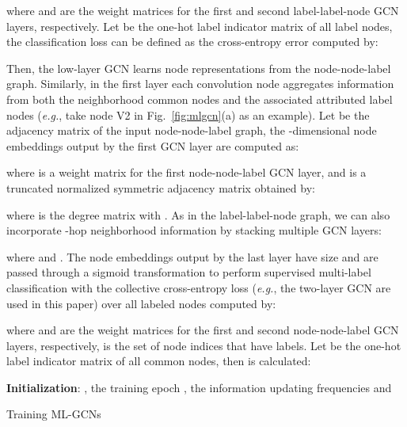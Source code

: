 \documentclass[conference]{IEEEtran}
\begin{document}
where  and  are the weight matrices for the first and second label-label-node GCN layers, respectively. Let  be the one-hot label indicator matrix of all label nodes, the classification loss can be defined as the cross-entropy error computed by:


Then, the low-layer GCN learns node representations from the node-node-label graph. Similarly, in the first layer each convolution node aggregates information from both the neighborhood common nodes and the associated attributed label nodes (\textit{e.g.}, take node V2 in Fig.~\ref{fig:mlgcn}(a) as an example). Let  be the  adjacency matrix of the input node-node-label graph, the -dimensional node embeddings output by the first GCN layer are computed as:

where  is a weight matrix for the first node-node-label GCN layer,  and  is a truncated normalized symmetric adjacency matrix obtained by:

where  is the degree matrix with . As in the  label-label-node graph, we can also incorporate -hop neighborhood information by stacking multiple GCN layers:

where  and . The node embeddings output by the last layer have size  and are passed through a sigmoid transformation to perform supervised multi-label classification with the collective cross-entropy loss (\textit{e.g.}, the two-layer GCN are used in this paper) over all labeled nodes computed by:


where  and  are the weight matrices for the first and second node-node-label GCN layers, respectively,  is the set of node indices that have labels. Let  be the one-hot label indicator matrix of all common nodes, then  is calculated:


\begin{algorithm}[t]
\SetAlgoLined
{}
\textbf{Initialization}: , the training epoch , the information updating frequencies  and 
\BlankLine
{}
\caption{Training ML-GCNs\label{EMDalg}}
\end{algorithm}
\end{document}
